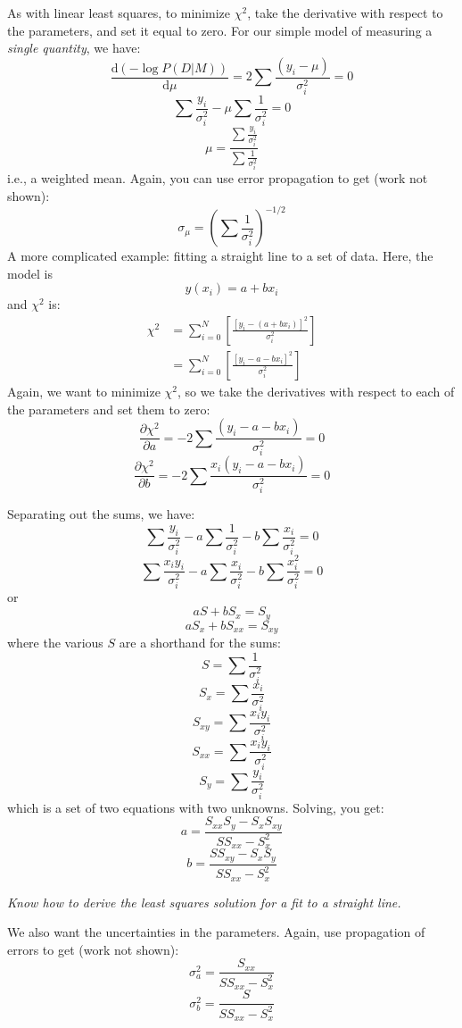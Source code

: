 \documentclass{article}
\newcommand{\test}[1]{%
    \begin{center}
        \colorbox{hl}{\parbox{0.9\textwidth}{\emph{\centering #1}}}
    \end{center}}
\begin{document}
As with linear least squares, to minimize $\chi^{2}$, take the derivative
with respect to the parameters, and set it equal to zero.
For our simple model of measuring a \emph{single quantity}, we have:
$$ \frac{\mathrm{d}(-\log P(D|M))}{\mathrm{d}\mu} =
    2\sum\frac{(y_{i}-\mu)}{\sigma_i^2} = 0
$$
$$ \sum\frac{y_i}{\sigma_i^2} - \mu\sum\frac{1}{\sigma_i^2} = 0
$$
$$ \mu = \frac{\sum\frac{y_i}{\sigma_i^2}}{\sum\frac{1}{\sigma_i^2}}
$$
i.e., a weighted mean. Again, you can use error
propagation to get (work not shown):
$$ \sigma_{\mu} = \left(\sum\frac{1}{\sigma_i^2}\right)^{-1/2}
$$
A more complicated example: fitting a straight line to a set of data.
Here, the model is
$$
    y(x_i) = a + bx_i
$$
and $\chi^2$ is:
\begin{align*}
    \chi^2 &= \sum_{i=0}^{N}\left[\frac{\left[y_i-(a+bx_i)\right]^2}{\sigma_i^2}\right]\\
           &= \sum_{i=0}^{N}\left[\frac{\left[y_i-a-bx_i\right]^2}{\sigma_i^2}\right]
\end{align*}
Again, we want to minimize $\chi^2$, so we take the derivatives with respect
to each of the parameters and set them to zero:
$$  \frac{\partial\chi^{2}}{\partial{a}} =
    -2\sum\frac{(y_i-a-bx_i)}{\sigma_i^2} = 0 $$
$$  \frac{\partial\chi^{2}}{\partial{b}} =
    -2\sum\frac{x_i(y_i-a-bx_i)}{\sigma_i^2} = 0 $$

Separating out the sums, we have:
$$  \sum\frac{y_i}{\sigma_i^2} -
   a\sum\frac{1}{\sigma_i^2} -
    b\sum\frac{x_i}{\sigma_i^2} = 0 $$
$$  \sum\frac{x_iy_i}{\sigma_i^2} -
    a\sum\frac{x_i}{\sigma_i^2} -
    b\sum\frac{x_i^2}{\sigma_i^2} = 0 $$
or
    $$ aS + bS_{x} = S_{y} $$
    $$ aS_{x} + bS_{xx} = S_{xy} $$
where the various $S$ are a shorthand for the sums:
    $$ S = \sum\frac{1}{\sigma_i^2}  $$
    $$ S_{x} = \sum\frac{x_i}{\sigma_i^2}  $$
    $$ S_{xy} = \sum\frac{x_iy_i}{\sigma_i^2}  $$
    $$ S_{xx} = \sum\frac{x_iy_i}{\sigma_i^2}  $$
    $$ S_{y} = \sum\frac{y_i}{\sigma_i^2}  $$
which is a set of two equations with two unknowns. Solving, you get:
$$ a = \frac{S_{xx}S_{y} - S_{x}S_{xy}}{SS_{xx} - S_{x}^{2}}  $$
$$ b = \frac{SS_{xy} - S_{x}S_{y}}{SS_{xx} - S_{x}^{2}}  $$

\test{Know how to derive the least squares solution for a fit to a straight
line.}

We also want the uncertainties in the parameters.
Again, use propagation of errors to get (work not shown):
$$ \sigma_a^2 = \frac{S_{xx}}{SS_{xx}-S_x^2}   $$
$$ \sigma_b^2 = \frac{S}{SS_{xx}-S_x^2}   $$
\end{document}
